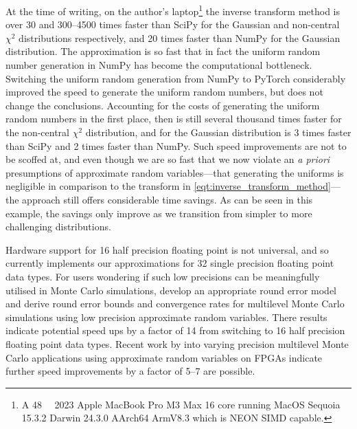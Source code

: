 At the time of writing, on the author's laptop\footnote{A \qty{48}{\giga\byte} 2023 Apple MacBook Pro M3 Max 16 core running MacOS Sequoia 15.3.2 Darwin 24.3.0 AArch64 ArmV8.3 which is NEON SIMD capable.} the inverse transform method is over 30 and \qtyrange{300}{4500}{} times faster than SciPy for the Gaussian and non-central \( \chi^2 \) distributions respectively, and 20 times faster than NumPy for the Gaussian distribution. The approximation is so fast that in fact the uniform random number generation in NumPy has become the computational bottleneck. Switching the uniform random generation from NumPy to PyTorch considerably improved the speed to generate the uniform random numbers, but does not change the conclusions. Accounting for the costs of generating the uniform random numbers in the first place, then \pyarv is still several thousand times faster for the non-central \( \chi^2 \) distribution, and for the Gaussian distribution is 3 times faster than SciPy and 2 times faster than NumPy. Such speed improvements are not to be scoffed at, and even though we are so fast that we now violate an \textit{a priori} presumptions of approximate random variables---that generating the uniforms is negligible in comparison to the transform in \cref{eqt:inverse_transform_method}---the approach still offers considerable time savings. As can be seen in this example, the savings only improve as we transition from simpler to more challenging distributions. 

Hardware support for \qty{16}{\bit} half precision floating point is not universal, and so \arv currently implements our approximations for \qty{32}{\bit} single precision floating point data types. For users wondering if such low precisions can be meaningfully utilised in Monte Carlo simulations, \citet{giles2024rounding} develop an appropriate round error model and derive round error bounds and convergence rates for multilevel Monte Carlo simulations using low precision approximate random variables. There results indicate potential speed ups by a factor of 14 from switching to \qty{16}{\bit} half precision floating point data types. Recent work by \citet{haas2025monte} into varying precision multilevel Monte Carlo applications using approximate random variables on FPGAs indicate further speed improvements by a factor of \qtyrange{5}{7}{} are possible.

